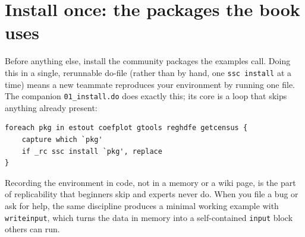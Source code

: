 \documentclass[
    a4paper,
    fontsize=10pt,
    twoside=true,
    numbers=noenddot,
]{kaobook}
\begin{document}
\section{Install once: the packages the book uses}
Before anything else, install the community packages the examples call. Doing this in a single, rerunnable do-file (rather than by hand, one \texttt{ssc install} at a time) means a new teammate reproduces your environment by running one file. The companion \texttt{01\_install.do} does exactly this; its core is a loop that skips anything already present:
{\footnotesize
\begin{verbatim}
foreach pkg in estout coefplot gtools reghdfe getcensus {
    capture which `pkg'
    if _rc ssc install `pkg', replace
}
\end{verbatim}
}
Recording the environment in code, not in a memory or a wiki page, is the part of replicability that beginners skip and experts never do. When you file a bug or ask for help, the same discipline produces a minimal working example with \texttt{writeinput}, which turns the data in memory into a self-contained \texttt{input} block others can run.
\end{document}
